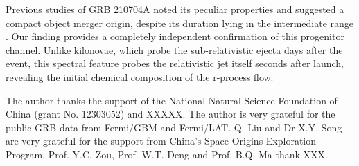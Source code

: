\documentclass[linenumbers,twocolumn]{aastex631}
\begin{document}
Previous studies of GRB 210704A noted its peculiar properties and suggested a compact object merger origin, despite its duration lying in the intermediate range \citep{2021GCN.30380....1M, 2023MNRAS.522.5204B}. Our finding provides a completely independent confirmation of this progenitor channel. Unlike kilonovae, which probe the sub-relativistic ejecta days after the event, this spectral feature probes the relativistic jet itself seconds after launch, revealing the initial chemical composition of the r-process flow.









 
\begin{acknowledgements}
 The author thanks the support of the National Natural Science Foundation of China (grant No. 12303052) and XXXXX. The author is very grateful for the public GRB data from Fermi/GBM and Fermi/LAT.  Q. Liu and Dr X.Y. Song are very grateful for the support from China's Space Origins Exploration Program. Prof. Y.C. Zou, Prof. W.T. Deng and Prof. B.Q. Ma thank XXX. 
\end{acknowledgements}



\end{document}
